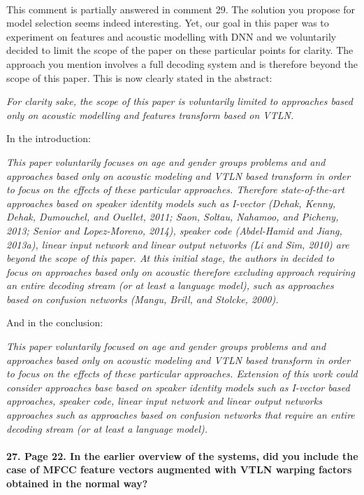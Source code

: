 \documentclass[]{article}
\begin{document}
~

This comment is partially answered in comment 29. The solution you propose for model selection seems indeed interesting. Yet, our goal in this paper was to experiment on features and acoustic modelling with DNN and we voluntarily decided to limit the scope of the paper on these particular points for clarity. The approach you mention involves a full decoding system and is therefore beyond the scope of this paper. This is now clearly stated in the abstract:

\textit{For clarity sake, the scope of this paper is voluntarily limited to approaches based only on acoustic modelling and features transform based on VTLN.}

In the introduction:

\textit{This paper voluntarily focuses on age and gender groups problems and and approaches based only on acoustic modeling and VTLN based transform in order to focus on the effects of these particular approaches. Therefore state-of-the-art approaches based on speaker identity models such as I-vector (Dehak, Kenny, Dehak, Dumouchel, and Ouellet, 2011; Saon, Soltau, Nahamoo, and Picheny, 2013; Senior
and Lopez-Moreno, 2014), speaker code (Abdel-Hamid and Jiang, 2013a), linear input network and linear output networks (Li and Sim, 2010) are beyond the scope of this paper. At this initial stage, the authors in decided to focus on approaches based only on acoustic therefore excluding approach requiring an entire decoding stream (or at least a language model), such as approaches based on confusion networks (Mangu, Brill, and Stolcke, 2000).}

And in the conclusion:

\textit{This paper voluntarily focused on age and gender groups problems and and approaches based only on acoustic modeling and VTLN based transform in order to focus on the effects of these particular approaches. Extension of this work could consider approaches base based on speaker identity models such as I-vector based approaches, speaker code, linear input network and linear output networks approaches such as approaches based on confusion networks that require an entire decoding stream (or at least a language model).}
\paragraph{27. Page 22. In the earlier overview of the systems, did you include the case of MFCC feature vectors augmented with VTLN warping factors obtained in the normal way?}
\end{document}
